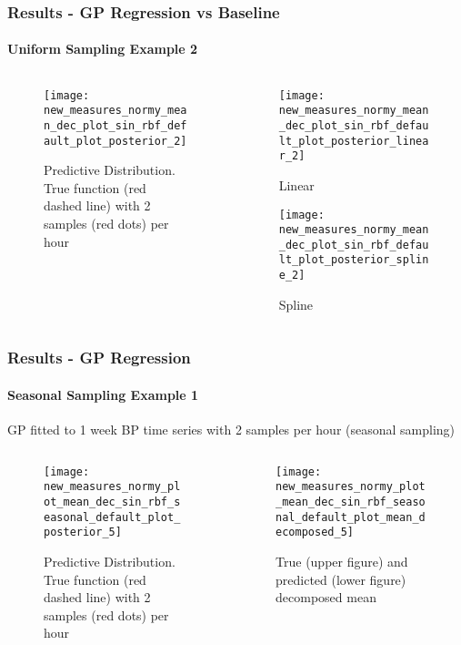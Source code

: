 \documentclass[
	8pt, %
]{beamer}
\begin{document}
\begin{frame}
	\frametitle{Results - GP Regression vs Baseline}
	\framesubtitle{Uniform Sampling Example 2}

	\begin{columns}[c] %
		\begin{column}{0.5\textwidth} %
				\begin{figure}
					\texttt{[image: new\_measures\_normy\_mean\_dec\_plot\_sin\_rbf\_default\_plot\_posterior\_2]}
					\caption{Predictive Distribution. True function (red dashed line) with 2 samples (red dots) per hour}
				\end{figure}
		\end{column}
		\begin{column}{0.5\textwidth} %
				\begin{figure}
					\texttt{[image: new\_measures\_normy\_mean\_dec\_plot\_sin\_rbf\_default\_plot\_posterior\_linear\_2]}
					\caption{Linear}
				\end{figure}

				\begin{figure}
					\texttt{[image: new\_measures\_normy\_mean\_dec\_plot\_sin\_rbf\_default\_plot\_posterior\_spline\_2]}
					\caption{Spline}
				\end{figure}
		\end{column}
	\end{columns}

\end{frame}


\begin{frame}
	\frametitle{Results - GP Regression}
	\framesubtitle{Seasonal Sampling Example  1}

	GP fitted to 1 week BP time series with 2 samples per hour (seasonal sampling)

		\begin{columns}[c] %
		\begin{column}{0.5\textwidth} %
				\begin{figure}
					\texttt{[image: new\_measures\_normy\_plot\_mean\_dec\_sin\_rbf\_seasonal\_default\_plot\_posterior\_5]}
					\caption{Predictive Distribution. True function (red dashed line) with 2 samples (red dots) per hour}
				\end{figure}
		\end{column}
		\begin{column}{0.5\textwidth} %
				\begin{figure}
					\texttt{[image: new\_measures\_normy\_plot\_mean\_dec\_sin\_rbf\_seasonal\_default\_plot\_mean\_decomposed\_5]}
					\caption{True (upper figure) and predicted (lower figure) decomposed mean}
				\end{figure}

		\end{column}
	\end{columns}

\end{frame}
\end{document}
